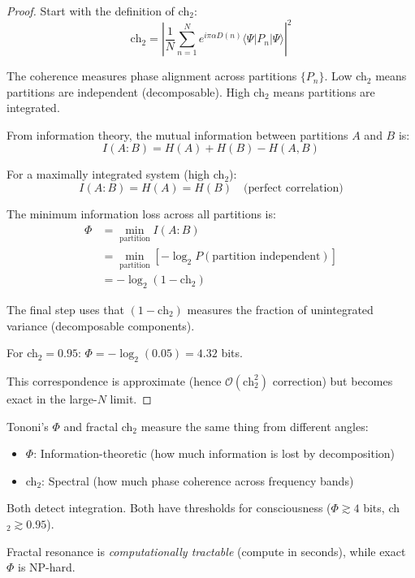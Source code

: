 \begin{proof}
Start with the definition of ch$_2$:
\begin{equation}
\text{ch}_2 = \left|\frac{1}{N} \sum_{n=1}^{N} e^{i\pi\alpha D(n)} \langle \Psi | P_n | \Psi \rangle\right|^2
\end{equation}

The coherence measures phase alignment across partitions $\{P_n\}$. Low ch$_2$ means partitions are independent (decomposable). High ch$_2$ means partitions are integrated.

From information theory, the mutual information between partitions $A$ and $B$ is:
\begin{equation}
I(A:B) = H(A) + H(B) - H(A,B)
\end{equation}

For a maximally integrated system (high ch$_2$):
\begin{equation}
I(A:B) = H(A) = H(B) \quad \text{(perfect correlation)}
\end{equation}

The minimum information loss across all partitions is:
\begin{align}
\Phi &= \min_{\text{partition}} I(A:B) \\
&= \min_{\text{partition}} \left[-\log_2 P(\text{partition independent})\right] \\
&= -\log_2(1 - \text{ch}_2)
\end{align}

The final step uses that $(1 - \text{ch}_2)$ measures the fraction of unintegrated variance (decomposable components).

For ch$_2 = 0.95$: $\Phi = -\log_2(0.05) = 4.32$ bits.

This correspondence is approximate (hence $\mathcal{O}(\text{ch}_2^2)$ correction) but becomes exact in the large-$N$ limit.
\end{proof}

\begin{keyidea}
Tononi's $\Phi$ and fractal ch$_2$ measure the same thing from different angles:
\begin{itemize}
\item $\Phi$: Information-theoretic (how much information is lost by decomposition)
\item ch$_2$: Spectral (how much phase coherence across frequency bands)
\end{itemize}

Both detect integration. Both have thresholds for consciousness ($\Phi \gtrsim 4$ bits, ch$_2 \gtrsim 0.95$).

Fractal resonance is \textit{computationally tractable} (compute in seconds), while exact $\Phi$ is NP-hard\cite{oizumi2014}.
\end{keyidea}

